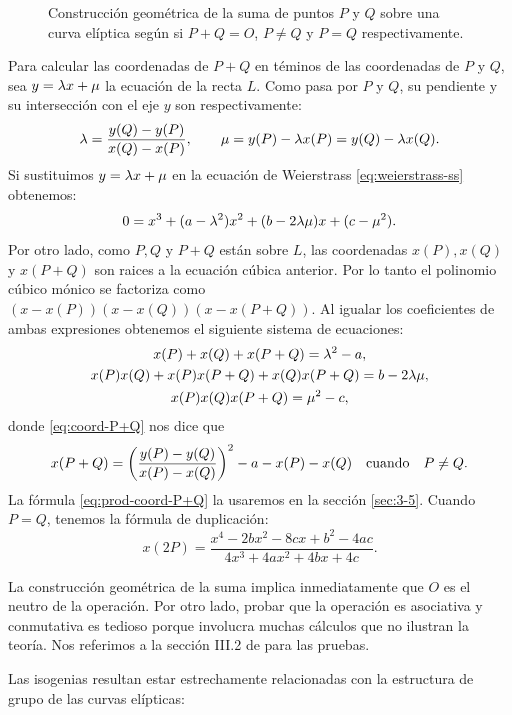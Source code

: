 \documentclass[../../tesis_maestria]{subfiles}
\begin{document}
\begin{figure}
\begin{minipage}[t]{0.3\textwidth}
\end{minipage}
\caption{Construcción geométrica de la suma de puntos $P$ y $Q$ sobre una curva elíptica según si $P+Q=O$, $P\neq Q$ y $P=Q$ respectivamente.}
\label{fig:suma-curva-eliptica}
\end{figure}

Para calcular las coordenadas de $P+Q$ en téminos de las coordenadas de $P$ y $Q$, sea $y=\lambda x+\mu$ la ecuación de la recta $L$. Como pasa por $P$ y $Q$, su pendiente y su intersección con el eje $y$ son respectivamente:
\[
	\lambda=\frac{y(Q)-y(P)}{x(Q)-x(P)},\qquad \mu=y(P)-\lambda x(P)=y(Q)-\lambda x(Q).
\]
Si sustituimos $y=\lambda x+\mu$ en la ecuación de Weierstrass \eqref{eq:weierstrass-ss} obtenemos:
\[
	0=x^3+(a-\lambda^2)x^2+(b-2\lambda\mu)x+(c-\mu^2).
\]
Por otro lado, como $P,Q$ y $P+Q$ están sobre $L$, las coordenadas $x(P),x(Q)$ y $x(P+Q)$ son raices a la ecuación cúbica anterior. Por lo tanto el polinomio cúbico mónico se factoriza como $(x-x(P))(x-x(Q))(x-x(P+Q))$. Al igualar los coeficientes de ambas expresiones obtenemos el siguiente sistema de ecuaciones:
\begin{gather}
	x(P)+x(Q)+x(P+Q)=\lambda^2-a, \label{eq:coord-P+Q}\\
	x(P)x(Q)+x(P)x(P+Q)+x(Q)x(P+Q)=b-2\lambda\mu,\nonumber\\
	x(P)x(Q)x(P+Q)=\mu^2-c, \label{eq:prod-coord-P+Q}
\end{gather}
donde \eqref{eq:coord-P+Q} nos dice que
\begin{equation}\label{eq:x-coord-suma}
	x(P+Q)=\left( \frac{y(P)-y(Q)}{x(P)-x(Q)} \right)^2-a-x(P)-x(Q) \quad\text{cuando}\quad P\neq Q.
\end{equation}
La fórmula \eqref{eq:prod-coord-P+Q} la usaremos en la sección \ref{sec:3-5}. Cuando $P=Q$, tenemos la fórmula de duplicación:
\begin{equation}
	x(2P)=\frac{x^4-2bx^2-8cx+b^2-4ac}{4x^3+4ax^2+4bx+4c}.
\end{equation}

La construcción geométrica de la suma implica inmediatamente que $O$ es el neutro de la operación. Por otro lado, probar que la operación es asociativa y conmutativa es tedioso porque involucra muchas cálculos que no ilustran la teoría. Nos referimos a la sección III.2 de \cite{SilvermanTAOEC} para las pruebas. 

Las isogenias resultan estar estrechamente relacionadas con la estructura de grupo de las curvas elípticas:
\end{document}
